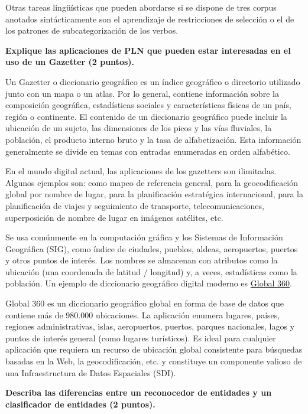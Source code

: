 \documentclass[11pt]{exam}
\begin{document}
\begin{questions}
Otras tareas lingüísticas que pueden abordarse si se dispone de tres corpus anotados sintácticamente son el aprendizaje de restricciones de selección o el de los patrones de subcategorización de los verbos.

{\bf \question Explique las aplicaciones de PLN que pueden estar interesadas en el uso de un Gazetter (2 puntos).}

Un Gazetter o diccionario geográfico es un índice geográfico o directorio utilizado junto con un mapa o un atlas. Por lo general, contiene información sobre la composición geográfica, estadísticas sociales y características físicas de un país, región o continente. El contenido de un diccionario geográfico puede incluir la ubicación de un sujeto, las dimensiones de los picos y las vías fluviales, la población, el producto interno bruto y la tasa de alfabetización. Esta información generalmente se divide en temas con entradas enumeradas en orden alfabético.

En el mundo digital actual, las aplicaciones de los gazetters son ilimitadas. Algunos ejemplos son: como mapeo de referencia general, para la geocodificación global por nombre de lugar, para la planificación estratégica internacional, para la planificación de viajes y seguimiento de transporte, telecomunicaciones, superposición de nombre de lugar en imágenes satélites, etc.

Se usa comúnmente en la computación gráfica y los Sistemas de Información Geográfica (SIG), como índice de ciudades, pueblos, aldeas, aeropuertos, puertos y otros puntos de interés. Los nombres se almacenan con atributos como la ubicación (una coordenada de latitud / longitud) y, a veces, estadísticas como la población. Un ejemplo de diccionario geográfico digital moderno es \href{https://www.europa.uk.com/map-data/global/global-360/}{Global 360}.

Global 360 es un diccionario geográfico global en forma de base de datos que contiene más de 980.000 ubicaciones. La aplicación enumera lugares, países, regiones administrativas, islas, aeropuertos, puertos, parques nacionales, lagos y puntos de interés general (como lugares turísticos). Es ideal para cualquier aplicación que requiera un recurso de ubicación global consistente para búsquedas basadas en la Web, la geocodificación, etc. y constituye un componente valioso de una Infraestructura de Datos Espaciales (SDI). 

{\bf \question Describa las diferencias entre un reconocedor de entidades y un clasificador de entidades (2 puntos).}


\end{questions}
\end{document}
